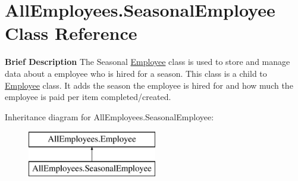 \hypertarget{class_all_employees_1_1_seasonal_employee}{}\section{All\+Employees.\+Seasonal\+Employee Class Reference}
\label{class_all_employees_1_1_seasonal_employee}


{\bfseries Brief Description} The Seasonal \hyperlink{class_all_employees_1_1_employee}{Employee} class is used to store and manage data about a employee who is hired for a season. This class is a child to \hyperlink{class_all_employees_1_1_employee}{Employee} class. It adds the season the employee is hired for and how much the employee is paid per item completed/created.  


Inheritance diagram for All\+Employees.\+Seasonal\+Employee\+:\begin{figure}[H]
\begin{center}
\leavevmode
\includegraphics[height=2.000000cm]{class_all_employees_1_1_seasonal_employee}
\end{center}
\end{figure}
